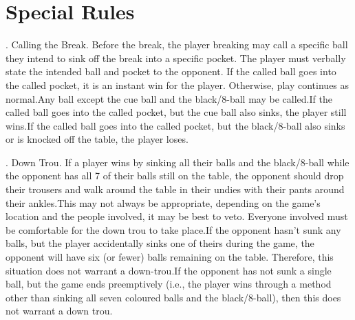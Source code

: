 \section{Special Rules} \label{8ball:special}
\ex. \label{8ball:callingthebreak} Calling the Break. Before the break, the player breaking may call a specific ball they intend to sink off the break into a specific pocket. The player must verbally state the intended ball and pocket to the opponent. If the called ball goes into the called pocket, it is an instant win for the player. Otherwise, play continues as normal.\itemspace Any ball except the cue ball and the black/8-ball may be called.\itemspace If the called ball goes into the called pocket, but the cue ball also sinks, the player still wins.\itemspace If the called ball goes into the called pocket, but the black/8-ball also sinks or is knocked off the table, the player loses.\par
\ex. Down Trou. If a player wins by sinking all their balls and the black/8-ball while the opponent has all 7 of their balls still on the table, the opponent should drop their trousers and walk around the table in their undies with their pants around their ankles.\itemspace This may not always be appropriate, depending on the game's location and the people involved, it may be best to veto. Everyone involved must be comfortable for the down trou to take place.\itemspace If the opponent hasn’t sunk any balls, but the player accidentally sinks one of theirs during the game, the opponent will have six (or fewer) balls remaining on the table. Therefore, this situation does not warrant a down-trou.\itemspace If the opponent has not sunk a single ball, but the game ends preemptively (i.e., the player wins through a method other than sinking all seven coloured balls and the black/8-ball), then this does not warrant a down trou.\par


